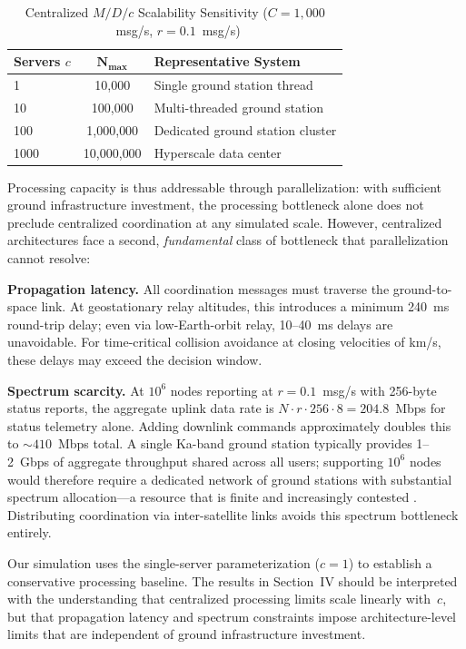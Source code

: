 \documentclass[journal]{IEEEtran}
\begin{document}
\begin{table}[t]
    \centering
    \caption{Centralized $M/D/c$ Scalability Sensitivity ($C = 1{,}000$~msg/s, $r = 0.1$~msg/s)}
    \label{tab:mdc_sensitivity}
    \begin{tabular}{@{}lcl@{}}
        \toprule
        \textbf{Servers $c$} & $\boldsymbol{N_{\max}}$ & \textbf{Representative System} \\
        \midrule
        1    & 10{,}000      & Single ground station thread \\
        10   & 100{,}000     & Multi-threaded ground station \\
        100  & 1{,}000{,}000 & Dedicated ground station cluster \\
        1000 & 10{,}000{,}000 & Hyperscale data center \\
        \bottomrule
    \end{tabular}
\end{table}

Processing capacity is thus addressable through parallelization: with sufficient ground infrastructure investment, the processing bottleneck alone does not preclude centralized coordination at any simulated scale. However, centralized architectures face a second, \emph{fundamental} class of bottleneck that parallelization cannot resolve:

\textbf{Propagation latency.} All coordination messages must traverse the ground-to-space link. At geostationary relay altitudes, this introduces a minimum 240~ms round-trip delay; even via low-Earth-orbit relay, 10--40~ms delays are unavoidable. For time-critical collision avoidance at closing velocities of km/s, these delays may exceed the decision window.

\textbf{Spectrum scarcity.} At $10^6$ nodes reporting at $r = 0.1$~msg/s with 256-byte status reports, the aggregate uplink data rate is $N \cdot r \cdot 256 \cdot 8 = 204.8$~Mbps for status telemetry alone. Adding downlink commands approximately doubles this to ${\sim}410$~Mbps total. A single Ka-band ground station typically provides 1--2~Gbps of aggregate throughput shared across all users; supporting $10^6$ nodes would therefore require a dedicated network of ground stations with substantial spectrum allocation---a resource that is finite and increasingly contested \cite{handley_2018}. Distributing coordination via inter-satellite links avoids this spectrum bottleneck entirely.

Our simulation uses the single-server parameterization ($c = 1$) to establish a conservative processing baseline. The results in Section~IV should be interpreted with the understanding that centralized processing limits scale linearly with~$c$, but that propagation latency and spectrum constraints impose architecture-level limits that are independent of ground infrastructure investment.
\end{document}
